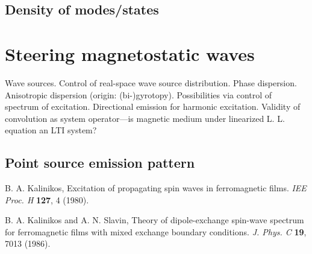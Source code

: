 \documentclass{article}
\begin{document}
\subsection{Density of modes/states}

\section{Steering magnetostatic waves}
Wave sources. Control of real-space wave source distribution. Phase dispersion. Anisotropic dispersion (origin: (bi-)gyrotopy). Possibilities via control of spectrum of excitation. Directional emission for harmonic excitation. Validity of convolution as system operator---is magnetic medium under linearized L. L. equation an LTI system?

\subsection{Point source emission pattern}

\begin{thebibliography}{99}

B. A. Kalinikos,
Excitation of propagating spin waves in ferromagnetic films.
{\it IEE Proc. H} {\bf 127}, 4 (1980).

B. A. Kalinikos and A. N. Slavin,
Theory of dipole-exchange spin-wave spectrum for ferromagnetic films with mixed exchange boundary conditions. 
{\it J. Phys. C} {\bf 19}, 7013 (1986).

\end{thebibliography}
\end{document}

